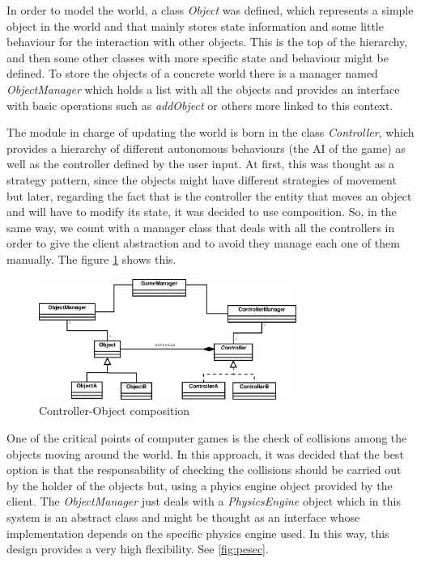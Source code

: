 \documentclass[]{article}
\begin{document}
In order to model the world, a class \emph{Object} was defined, which represents a simple object in the world and that mainly stores state information and some little behaviour for the interaction
with other objects. This is the top of the hierarchy, and then some other classes with more specific state and behaviour might be defined. To store the objects of a concrete world there is a manager
named \emph{ObjectManager} which holds a list with all the objects and provides an interface with basic operations such as \emph{addObject} or others more linked to this context.

The module in charge of updating the world is born in the class \emph{Controller}, which provides a hierarchy of different autonomous behaviours (the AI of the game) as well as the controller defined
by the user input. At first, this was thought as a strategy pattern, since the objects might have different strategies of movement but later, regarding the fact that is the controller the entity
that moves an object and will have to modify its state, it was decided to use composition. So, in the same way, we count with a manager class that deals with all the controllers in order to give 
the client abstraction and to avoid they manage each one of them manually. The figure \ref{fig:object-controller} shows this.

\begin{figure}[h]
\begin{center}
\includegraphics[width=0.75\textwidth]{images/object-controller.eps}
\caption{Controller-Object composition}
\label{fig:object-controller}
\end{center}
\end{figure}

One of the critical points of computer games is the check of collisions among the objects moving around the world. In this approach, it was decided that the best option is that the responsability
of checking the collisions should be carried out by the holder of the objects but, using a phyics engine object provided by the client. The \emph{ObjectManager} just deals with a \emph{PhysicsEngine}
object which in this system is an abstract class and might be thought as an interface whose implementation depends on the specific physics engine used. In this way, this design provides a very high
flexibility. See \ref{fig:pesec}.
\end{document}
